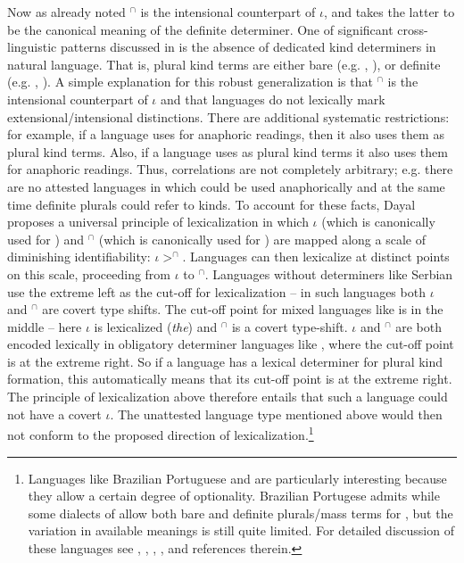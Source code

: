 \documentclass[output=paper,
modfonts
]{langscibook}
\begin{document}
	Now as already noted $^\cap$ is the intensional counterpart of $\iota$, and \citet{Dayal2004} takes the latter to be the canonical meaning of the definite determiner. One of significant cross-linguistic patterns discussed in \citet{Dayal2004} is the absence of dedicated kind determiners in natural language. That is, plural kind terms are either bare (e.g. , ), or definite (e.g. , ). A simple explanation for this robust generalization is that $^\cap$ is the intensional counterpart of $\iota$ and that languages do not lexically mark extensional/intensional distinctions. There are additional systematic restrictions: for example, if a language uses  for anaphoric readings, then it also uses them as plural kind terms. Also, if a language uses  as plural kind terms it also uses them for anaphoric readings. Thus, correlations are not completely arbitrary; e.g. there are no attested languages in which  could be used anaphorically and at the same time definite plurals could refer to kinds. To account for these facts, Dayal proposes a universal principle of lexicalization in which $\iota$ (which is canonically used for ) and $^\cap$ (which is canonically used for ) are mapped along a scale of diminishing identifiability: $\iota>^\cap$. Languages can then lexicalize at distinct points on this scale, proceeding from $\iota$ to $^\cap$. Languages without determiners like Serbian use the extreme left as the cut-off for lexicalization -- in such languages both $\iota$ and $^\cap$ are covert type shifts. The cut-off point for mixed languages like  is in the middle -- here $\iota$ is lexicalized (\textit{the}) and $^\cap$ is a covert type-shift. $\iota$ and $^\cap$ are both encoded lexically in obligatory determiner languages like , where the cut-off point is at the extreme right. So if a language has a lexical determiner for plural kind formation, this automatically means that its cut-off point is at the extreme right. The principle of lexicalization above therefore entails that such a language could not have a covert $\iota$. The unattested language type mentioned above would then not conform to the proposed direction of lexicalization.\footnote{Languages like Brazilian Portuguese and  are particularly interesting because they allow a certain degree of optionality. Brazilian Portugese admits  while some dialects of  allow both bare and definite plurals/mass terms for , but the variation in available meanings is still quite limited. For detailed discussion of these languages see \citet{Dayal2004,Dayal2011}, \citet{Krifka1995}, \citet{Muller2002}, \citet{MunnSchmitt2005}, \citet{Cyrino2015} and references therein.} 
	
\end{document}

